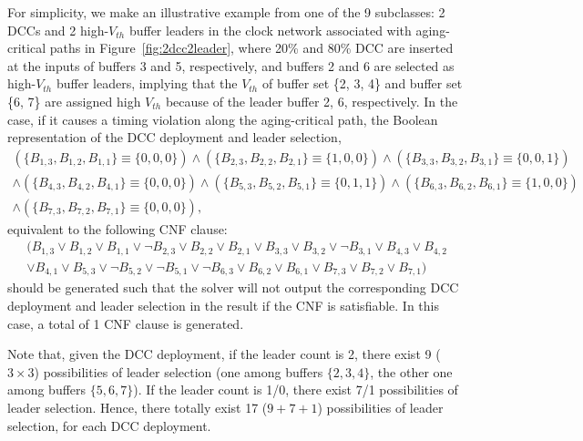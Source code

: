 For simplicity, we make an illustrative example from one of the 9 subclasses: 2 DCCs and 2 high-$V_{th}$ buffer leaders in the clock network associated with aging-critical paths in Figure~\ref{fig:2dcc2leader}, where 20\% and 80\% DCC are inserted at the inputs of buffers 3 and 5, respectively, and buffers 2 and 6 are selected as high-$V_{th}$ buffer leaders, implying that the $V_{th}$ of buffer set \{2, 3, 4\} and buffer set \{6, 7\} are assigned high $V_{th}$ because of the leader buffer 2, 6, respectively. In the case, if it causes a timing violation along the aging-critical path, the Boolean representation of the DCC deployment and leader selection,
{\fontsize{9}{10}
\begin{gather*}
\left(\{B_{1,3}, B_{1,2}, B_{1,1}\} \equiv \{0, 0, 0\} \right) \land \left( \{B_{2,3}, B_{2,2}, B_{2,1}\} \equiv \{1, 0, 0\} \right) \land \left(\{B_{3,3}, B_{3,2}, B_{3,1}\} \equiv \{0, 0, 1\} \right) \\ 
\land \left( \{B_{4,3}, B_{4,2}, B_{4,1}\} \equiv \{0, 0, 0\} \right) \land \left(\{B_{5,3}, B_{5,2}, B_{5,1}\} \equiv \{0, 1, 1\} \right) \land \left( \{B_{6,3}, B_{6,2}, B_{6,1}\} \equiv \{1, 0, 0\} \right)\\
\land \left( \{B_{7,3}, B_{7,2}, B_{7,1}\} \equiv \{0, 0, 0\} \right),
\end{gather*}}equivalent to the following CNF clause:
{\fontsize{9}{10}
\begin{gather*}
(B_{1,3} \lor B_{1,2} \lor B_{1,1} \lor \neg B_{2,3} \lor B_{2,2} \lor B_{2,1}  \lor B_{3,3} \lor B_{3,2} \lor \neg B_{3,1} \lor B_{4,3} \lor B_{4,2} \\
\lor B_{4,1} \lor B_{5,3} \lor \neg B_{5,2} \lor \neg B_{5,1} \lor \neg  B_{6,3} \lor B_{6,2} \lor B_{6,1} \lor B_{7,3} \lor B_{7,2} \lor B_{7,1} )
\end{gather*}}should be generated such that the solver will not output the corresponding DCC deployment and leader selection in the result if the CNF is satisfiable. In this case, a total of 1 CNF clause is generated.

Note that, given the DCC deployment, if the leader count is 2, there exist 9 ($3 \times 3$) possibilities of leader selection (one among buffers $\{2, 3, 4\}$, the other one among buffers $\{5, 6, 7\}$). If the leader count is 1/0, there exist 7/1 possibilities of leader selection. Hence, there totally exist 17 ($9+7+1$) possibilities of leader selection, for each DCC deployment.




